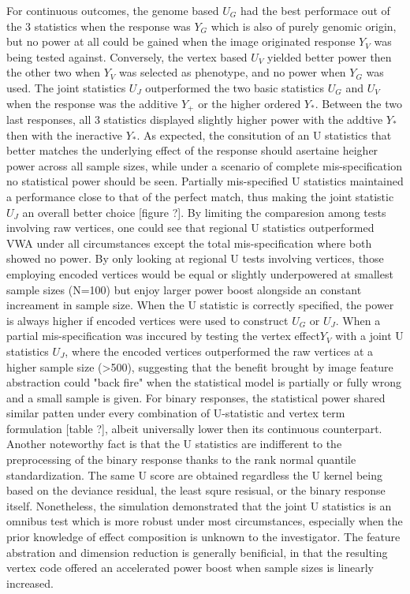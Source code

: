 \documentclass[twocolumn]{article}
\begin{document}
For continuous outcomes, the genome based $U_G$ had the best performace out of the 3 statistics when the response was $Y_G$ which is also of purely genomic origin, but no power at all could be gained when the image originated response $Y_V$ was being tested against. Conversely, the vertex based $U_V$ yielded better power then the other two when $Y_V$ was selected as phenotype, and no power when $Y_G$ was used. The joint statistics $U_J$ outperformed the two basic statistics $U_G$ and $U_V$ when the response was the additive $Y_+$ or the higher ordered $Y_*$. Between the two last responses, all 3 statistics displayed slightly higher power with the addtive $Y_*$ then with the ineractive $Y_*$. As expected, the consitution of an U statistics that better matches the underlying effect of the response should asertaine heigher power across all sample sizes, while under a scenario of complete mis-specification no statistical power should be seen. Partially mis-specified U statistics maintained a performance close to that of the perfect match, thus making the joint statistic $U_J$ an overall better choice [figure ?].
By limiting the comparesion among tests involving raw vertices, one could see that regional U statistics outperformed VWA under all circumstances except the total mis-specification where both showed no power. By only looking at regional U tests involving vertices, those employing encoded vertices would be equal or slightly underpowered at smallest sample sizes (N=100) but enjoy larger power boost alongside an constant increament in sample size. When the U statistic is correctly specified, the power is always higher if encoded vertices were used to construct $U_G$ or $U_J$. When a partial mis-specification was inccured by testing the vertex effect$Y_V$ with a joint U statistics $U_J$, where the encoded vertices outperformed the raw vertices at a higher sample size (>500), suggesting that the benefit brought by image feature abstraction could "back fire" when the statistical model is partially or fully wrong and a small sample is given. 
For binary responses, the statistical power shared similar patten under every combination of U-statistic and vertex term formulation [table ?], albeit universally lower then its continuous counterpart. Another noteworthy fact is that the U statistics are indifferent to the preprocessing of the binary response thanks to the rank normal quantile standardization. The same U score are obtained regardless the U kernel being based on the deviance residual, the least squre resisual, or the binary response itself.
Nonetheless, the simulation demonstrated that the joint U statistics is an omnibus test which is more robust under most circumstances, especially when the prior knowledge of effect composition is unknown to the investigator. The feature abstration and dimension reduction is generally benificial, in that the resulting vertex code offered an accelerated power boost when sample sizes is linearly increased.
\end{document}
